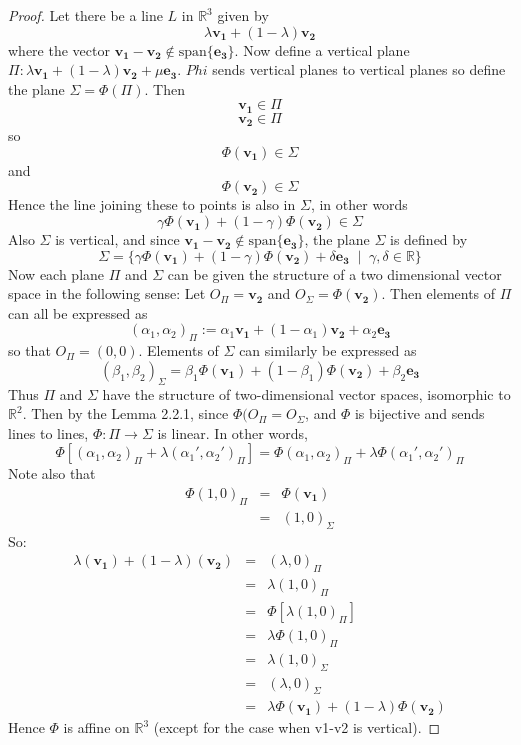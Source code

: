 \documentclass[honours]{UNSWthesis}
\newcommand{\R}{\mathbb{R}}
\newcommand{\1}{\mathbf{e}_{1}}
\newcommand{\2}{\mathbf{e}_{3}}
\newcommand{\3}{\mathbf{e}_{3}}
\begin{document}
\begin{proof}
Let there be a line $L$ in $\R^{3}$ given by $$\lambda \mathbf{v_{1}} + (1-\lambda) \mathbf{v_{2}} $$ where the vector $\mathbf{v_{1}}-\mathbf{v_{2}} \notin \text{span} \{ \mathbf{e_{3}} \}$. 
Now define a vertical plane $\Pi: \lambda \mathbf{v_{1}} + (1-\lambda) \mathbf{v_{2}} + \mu\mathbf{e_{3}}$. $Phi$ sends vertical planes to vertical planes so define the plane $\Sigma = \Phi(\Pi)$. Then 
\[
\mathbf{v_{1}} \in \Pi
\]
\[
\mathbf{v_{2}} \in \Pi
\]
so 
\[
\Phi(\mathbf{v_{1}}) \in \Sigma
\]
and 
\[
\Phi(\mathbf{v_{2}}) \in \Sigma
\]
Hence the line joining these to points is also in $\Sigma$, in other words
\[
\gamma \Phi(\mathbf{v_{1}}) + (1-\gamma)\Phi(\mathbf{v_{2}}) \in \Sigma
\]
Also $\Sigma$ is vertical, and since $\mathbf{v_{1}}-\mathbf{v_{2}} \notin \text{span}\{ \mathbf{e_{3}}\}$, the plane $\Sigma$ is defined by 
\[
\Sigma = \{ \gamma \Phi(\mathbf{v_{1}}) + (1-\gamma)\Phi(\mathbf{v_{2}}) + \delta\mathbf{e_{3}} \; \;|\;\; \gamma,\delta \in \R \}
\]
Now each plane $\Pi$ and $\Sigma$ can be given the structure of a two dimensional vector space in the following sense:
Let $O_{\Pi}=\mathbf{v_{2}}$ and $O_{\Sigma}= \Phi(\mathbf{v_{2}})$. Then elements of $\Pi$ can all be expressed as 
\[
(\alpha_{1}, \alpha_{2})_{\Pi}:= \alpha_{1}\mathbf{v_{1}}+(1-\alpha_{1})\mathbf{v_{2}} + \alpha_{2}\mathbf{e_{3}}
\]
so that $O_{\Pi}=(0,0)$. 
Elements of $\Sigma$ can similarly be expressed as
\[
(\beta_{1}, \beta_{2})_{\Sigma}= \beta_{1}\Phi(\mathbf{v_{1}})+(1-\beta_{1})\Phi(\mathbf{v_{2}}) + \beta_{2}\mathbf{e_{3}}
\]
Thus $\Pi$ and $\Sigma$ have the structure of two-dimensional vector spaces, isomorphic to $\R^2$. Then by the Lemma 2.2.1, since $\Phi(O_{\Pi}=O_{\Sigma}$, and $\Phi$ is bijective and sends lines to lines, $\Phi:\Pi \longrightarrow \Sigma$ is linear. In other words, 
\[
\Phi[(\alpha_{1},\alpha_{2})_{\Pi}+\lambda(\alpha_{1}',\alpha_{2}')_{\Pi}]=\Phi(\alpha_{1},\alpha_{2})_{\Pi} + \lambda \Phi(\alpha_{1}',\alpha_{2}')_{\Pi}
\]
Note also that 
\begin{eqnarray*}
\Phi(1,0)_{\Pi}&=&\Phi(\mathbf{v_{1}}) \\
&=& (1,0)_{\Sigma}
\end{eqnarray*}
So:
\begin{eqnarray*}
\lambda(\mathbf{v_{1}})+(1-\lambda)(\mathbf{v_{2}}) &=& (\lambda,0)_{\Pi} \\
&=&\lambda(1,0)_{\Pi} \\
&=& \Phi[\lambda(1,0)_{\Pi}] \\
&=& \lambda\Phi(1,0)_{\Pi} \\
&=& \lambda(1,0)_{\Sigma} \\
&=&(\lambda,0)_{\Sigma} \\
&=& \lambda\Phi(\mathbf{v_{1}})+(1-\lambda)\Phi(\mathbf{v_{2}})
\end{eqnarray*}
Hence $\Phi$ is affine on $\R^{3}$ (except for the case when v1-v2 is vertical).
\end{proof}
\end{document}
